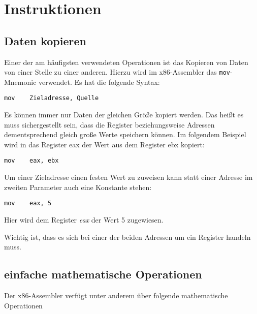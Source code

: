 \section{Instruktionen}

\subsection{Daten kopieren}
Einer der am häufigsten verwendeten Operationen ist das Kopieren von Daten von einer Stelle zu einer anderen.
Hierzu wird im x86-Assembler das \texttt{mov}-Mnemonic verwendet. Es hat die folgende Syntax:

\begin{verbatim}mov    Zieladresse, Quelle\end{verbatim}

Es können immer nur Daten der gleichen Größe kopiert werden.
Das heißt es muss sichergestellt sein, dass die Register beziehungsweise Adressen dementsprechend gleich große Werte speichern können.
Im folgendem Beispiel wird in das Register eax der Wert aus dem Register ebx kopiert:

\begin{verbatim}mov    eax, ebx\end{verbatim}

Um einer Zieladresse einen festen Wert zu zuweisen kann statt einer Adresse im zweiten Parameter auch eine Konstante stehen:

\begin{verbatim}mov    eax, 5\end{verbatim}

Hier wird dem Register \textit{eax} der Wert 5 zugewiesen.

Wichtig ist, dass es sich bei einer der beiden Adressen um ein Register handeln muss.


\subsection{einfache mathematische Operationen}
Der x86-Assembler verfügt unter anderem über folgende mathematische Operationen

